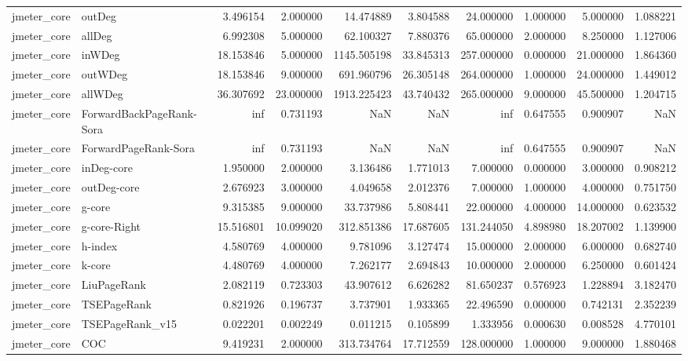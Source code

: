\begin{tabular}{llrrrrrrrr}
jmeter_core & outDeg & 3.496154 & 2.000000 & 14.474889 & 3.804588 & 24.000000 & 1.000000 & 5.000000 & 1.088221 \\
jmeter_core & allDeg & 6.992308 & 5.000000 & 62.100327 & 7.880376 & 65.000000 & 2.000000 & 8.250000 & 1.127006 \\
jmeter_core & inWDeg & 18.153846 & 5.000000 & 1145.505198 & 33.845313 & 257.000000 & 0.000000 & 21.000000 & 1.864360 \\
jmeter_core & outWDeg & 18.153846 & 9.000000 & 691.960796 & 26.305148 & 264.000000 & 1.000000 & 24.000000 & 1.449012 \\
jmeter_core & allWDeg & 36.307692 & 23.000000 & 1913.225423 & 43.740432 & 265.000000 & 9.000000 & 45.500000 & 1.204715 \\
jmeter_core & ForwardBackPageRank-Sora & inf & 0.731193 & NaN & NaN & inf & 0.647555 & 0.900907 & NaN \\
jmeter_core & ForwardPageRank-Sora & inf & 0.731193 & NaN & NaN & inf & 0.647555 & 0.900907 & NaN \\
jmeter_core & inDeg-core & 1.950000 & 2.000000 & 3.136486 & 1.771013 & 7.000000 & 0.000000 & 3.000000 & 0.908212 \\
jmeter_core & outDeg-core & 2.676923 & 3.000000 & 4.049658 & 2.012376 & 7.000000 & 1.000000 & 4.000000 & 0.751750 \\
jmeter_core & g-core & 9.315385 & 9.000000 & 33.737986 & 5.808441 & 22.000000 & 4.000000 & 14.000000 & 0.623532 \\
jmeter_core & g-core-Right & 15.516801 & 10.099020 & 312.851386 & 17.687605 & 131.244050 & 4.898980 & 18.207002 & 1.139900 \\
jmeter_core & h-index & 4.580769 & 4.000000 & 9.781096 & 3.127474 & 15.000000 & 2.000000 & 6.000000 & 0.682740 \\
jmeter_core & k-core & 4.480769 & 4.000000 & 7.262177 & 2.694843 & 10.000000 & 2.000000 & 6.250000 & 0.601424 \\
jmeter_core & LiuPageRank & 2.082119 & 0.723303 & 43.907612 & 6.626282 & 81.650237 & 0.576923 & 1.228894 & 3.182470 \\
jmeter_core & TSEPageRank & 0.821926 & 0.196737 & 3.737901 & 1.933365 & 22.496590 & 0.000000 & 0.742131 & 2.352239 \\
jmeter_core & TSEPageRank_v15 & 0.022201 & 0.002249 & 0.011215 & 0.105899 & 1.333956 & 0.000630 & 0.008528 & 4.770101 \\
jmeter_core & COC & 9.419231 & 2.000000 & 313.734764 & 17.712559 & 128.000000 & 1.000000 & 9.000000 & 1.880468 \\

\end{tabular}
